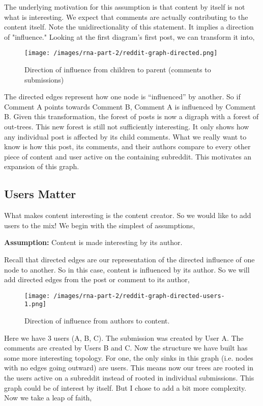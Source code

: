 The underlying motivation for this assumption is that content by itself is not what is interesting.
We expect that comments are actually contributing to the content itself.
Note the unidirectionality of this statement.
It implies a direction of "influence."
Looking at the first diagram's first post, we can transform it into,
%
\begin{figure}
    \texttt{[image: /images/rna-part-2/reddit-graph-directed.png]}
    \caption{Direction of influence from children to parent (comments to submissions)}
\end{figure}
%
The directed edges represent how one node is ``influenced'' by another.
So if Comment A points towards Comment B, Comment A is influenced by Comment B.
Given this transformation, the forest of posts is now a digraph with a forest of out-trees.
This new forest is still not sufficiently interesting.
It only shows how any individual post is affected by its child comments.
What we really want to know is how this post, its comments, and their authors compare to every other piece of content and user active on the containing subreddit.
This motivates an expansion of this graph.

\subsection{Users Matter}
What makes content interesting is the content creator.
So we would like to add users to the mix! We begin with the simplest of assumptions,

\textbf{Assumption:} Content is made interesting by its author.

Recall that directed edges are our representation of the directed influence of one node to another.
So in this case, content is influenced by its author.
So we will add directed edges from the post or comment to its author,
%
\begin{figure}
    \texttt{[image: /images/rna-part-2/reddit-graph-directed-users-1.png]}
    \caption{Direction of influence from authors to content.}
\end{figure}
%
Here we have 3 users (A, B, C).
The submission was created by User A.
The comments are created by Users B and C.
Now the structure we have built has some more interesting topology.
For one, the only sinks in this graph (i.e. nodes with no edges going outward) are users.
This means now our trees are rooted in the users active on a subreddit instead of rooted in individual submissions.
This graph could be of interest by itself.
But I chose to add a bit more complexity. Now we take a leap of faith,

